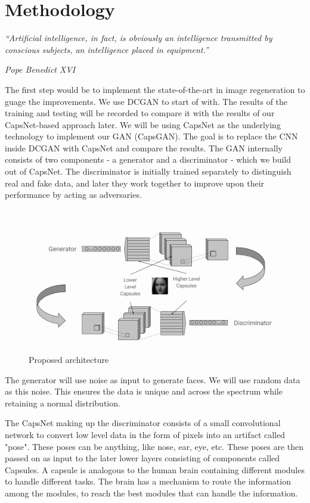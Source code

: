 \chapter{Methodology}\label{ch:methodology}
\epigraph{\textit{\Large “Artificial intelligence, in fact, is obviously an intelligence transmitted by conscious subjects, an intelligence placed in equipment.”}}{\textit{ \large Pope Benedict XVI}}

The first step would be to implement the state-of-the-art in image regeneration to guage the improvements. We use DCGAN to start of with. The results of the training and testing will be recorded to compare it with the results of our CapsNet-based approach later. We will be using CapsNet as the underlying technology to implement our GAN (CapsGAN). The goal is to replace the CNN inside DCGAN with CapsNet and compare the results. The GAN internally consists of two components - a generator and a discriminator - which we build out of CapsNet. The discriminator is initially trained separately to distinguish real and fake data, and later they work together to improve upon their performance by acting as adversaries.
\par\bigskip

\begin{figure}[H]
\centering\includegraphics[width=1\textwidth]{images/methodology.png}
\caption{Proposed architecture}
\end{figure}

The generator will use noise as input to generate faces. We will use random data as this noise. This ensures the data is unique and across the spectrum while retaining a normal distribution.
\par\bigskip

The CapsNet making up the discriminator consists of a small convolutional network to convert low level data in the form of pixels into an artifact called "pose". These poses can be anything, like nose, ear, eye, etc. These poses are then passed on as input to the later lower layers consisting of components called Capsules. A capsule is analogous to the human brain containing different modules to handle different tasks. The brain has a mechanism to route the information among the modules, to reach the best modules that can handle the information.
\par\bigskip

